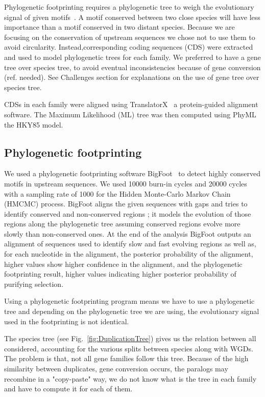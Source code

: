 Phylogenetic footprinting requires a phylogenetic tree to weigh the evolutionary signal of given motifs~\citep{zhang_mice_2003}. A motif conserved between two close species will have less importance than a motif conserved in two distant species. Because we are focusing on the conservation of upstream sequences we chose not to use them to avoid circularity. Instead,corresponding coding sequences (CDS) were extracted and used to model phylogenetic trees for each family. We preferred to have a gene tree over species tree, to avoid eventual inconsistencies because of gene conversion (ref. needed). See Challenges section for explanations on the use of gene tree over species tree.

CDSs in each family were aligned using TranslatorX~\citep{abascal_translatorx:_2010} a protein-guided alignment software. The Maximum Likelihood (ML) tree was then computed using PhyML~\citep{guindon_new_2010} the HKY85 model.

\subsection*{Phylogenetic footprinting}

We used a phylogenetic footprinting software BigFoot~\citep{satija_bigfoot:_2009} to detect highly conserved motifs in upstream sequences. We used 10000 burn-in cycles and 20000 cycles with a sampling rate of 1000 for the Hidden Monte-Carlo Markov Chain (HMCMC) process. BigFoot aligns the given sequences with gaps and tries to identify conserved and non-conserved regions ; it models the evolution of those regions along the phylogenetic tree assuming conserved regions evolve more slowly than non-conserved ones. At the end of the analysis BigFoot outputs an alignment of sequences used to identify slow and fast evolving regions as well as, for each nucleotide in the alignment, the posterior probability of the alignment, higher values show higher confidence in the alignment, and the phylogenetic footprinting result, higher values indicating higher posterior probability of purifying selection.

Using a phylogenetic footprinting program means we have to use a phylogenetic tree and depending on the phylogenetic tree we are using, the evolutionary signal used in the footprinting is not identical.

The species tree (see Fig.~\ref{fig:DuplicationTree}) gives us the relation between all considered, accounting for the various splits between species along with WGDs. The problem is that, not all gene families follow this tree. Because of the high similarity between duplicates, gene conversion occurs, the paralogs may recombine in a "copy-paste" way, we do not know what is the tree in each family and have to compute it for each of them.

